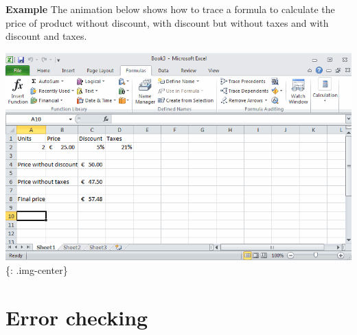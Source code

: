 \textbf{Example} The animation below shows how to trace a formula to calculate the price of product without discount, with discount but without taxes and with discount and taxes.

\includegraphics[keepaspectratio,width=\textwidth,height=0.75\textheight]{img/example_formula_trace.gif}
\{: .img-center\}

\section{Error checking}
\label{errorchecking}

